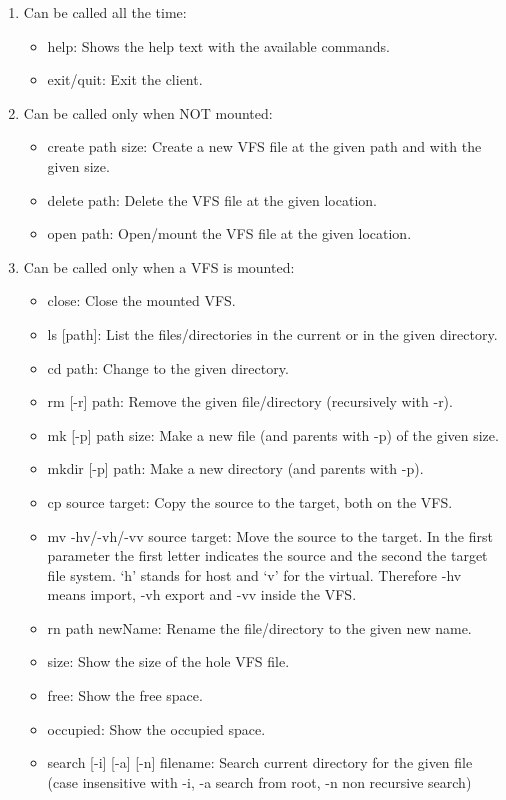 \documentclass[a4paper,12pt]{article}
\begin{document}
\begin{enumerate}
	\item Can be called all the time:
	\begin{itemize}
		\item help: Shows the help text with the available commands.
		\item exit/quit: Exit the client.
	\end{itemize}
	\item Can be called only when NOT mounted:
	\begin{itemize}
		\item create path size: Create a new VFS file at the given path and with the given size.
		\item delete path: Delete the VFS file at the given location.
		\item open path: Open/mount the VFS file at the given location.
	\end{itemize}
	\item Can be called only when a VFS is mounted:
	\begin{itemize}
		\item close: Close the mounted VFS.
		\item ls [path]: List the files/directories in the current or in the given directory.
		\item cd path: Change to the given directory.
		\item rm [-r] path: Remove the given file/directory (recursively with -r).
		\item mk [-p] path size: Make a new file (and parents with -p) of the given size.
		\item mkdir [-p] path: Make a new directory (and parents with -p).
		\item cp source target: Copy the source to the target, both on the VFS.
		\item mv -hv/-vh/-vv source target: Move the source to the target. In the first parameter the first letter indicates the source and the second the target file system.  ‘h’ stands for host and ‘v’ for the virtual. Therefore -hv means import, -vh export and -vv inside the VFS.
		\item rn path newName: Rename the file/directory to the given new name.
		\item size: Show the size of the hole VFS file.
		\item free: Show the free space.
		\item occupied: Show the occupied space.
		\item search [-i] [-a] [-n] filename: Search current directory for the given file (case insensitive with -i, -a search from root, -n non recursive search)
	\end{itemize}
\end{enumerate}
\end{document}
